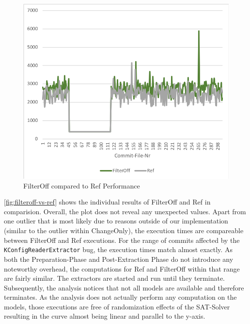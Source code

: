 \documentclass[a4paper]{article}
\begin{document}
\begin{figure}[h] 
  \centering
  \begin{minipage}[b]{1\textwidth} 
    \caption[FilterOff compared to Ref Performance]{FilterOff compared to Ref Performance}\label{fig:filteroff-vs-ref}
    \includegraphics[width=1\textwidth]{img/filteroff-vs-ref.png}
  \end{minipage}
\end{figure}

\autoref{fig:filteroff-vs-ref} shows the individual results of FilterOff and Ref in comparision. Overall, the plot does not reveal any unexpected values. Apart from one outlier that is most likely due to reasons outside of our implementation (similar to the outlier within ChangeOnly), the execution times are compareable between FilterOff and Ref executions. For the range of commits affected by the \texttt{KConfigReaderExtractor} bug, the execution times match almost exactly. As both the Preparation-Phase and Post-Extraction Phase do not introduce any noteworthy overhead, the computations for Ref and FilterOff within that range are fairly similar. The extractors are started and run until they terminate. Subsequently, the analysis notices that not all models are available and therefore terminates. As the analysis does not actually perform any computation on the models, those executions are free of randomization effects of the SAT-Solver resulting in the curve almost being linear and parallel to the y-axis.

\clearpage
\newpage
\end{document}
